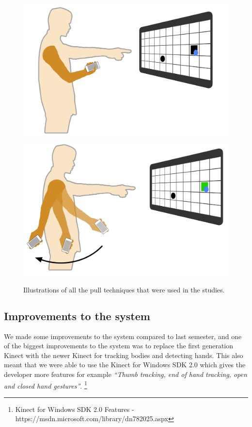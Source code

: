 \begin{figure}[H]
{		\includegraphics[width = 0.16\columnwidth]{images/techniques/throwPull2.jpg}\label{fig:throwPull2}
		\includegraphics[width = 0.16\columnwidth]{images/techniques/throwPull3.jpg}\label{fig:throwPull3}}
	\caption{Illustrations of all the pull techniques that were used in the studies.}
	\label{fig:pullTechniques}
\end{figure}

\subsection*{Improvements to the system}\label{sec:systemImprovements}
We made some improvements to the system compared to last semester, and one of the biggest improvements to the system was to replace the first generation Kinect with the newer Kinect for tracking bodies and detecting hands.
This also meant that we were able to use the Kinect for Windows SDK 2.0 which gives the developer more features for example \textit{``Thumb tracking, end of hand tracking, open and closed hand gestures''}. \footnote{Kinect for Windows SDK 2.0 Features - https://msdn.microsoft.com/library/dn782025.aspx}

